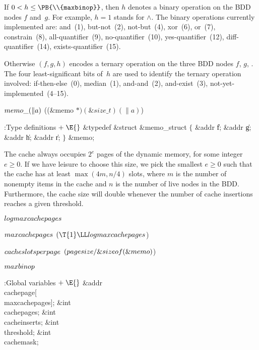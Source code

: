 \smallskip\textindent{$\bullet$} If $0<h\le\PB{\\{maxbinop}}$, then $h$
denotes a binary operation on the BDD nodes $f$ and~$g$.
For example, $h=1$ stands for $\land$. The binary operations currently
implemented are:
and~(1),
but-not~(2),
not-but~(4),
xor~(6),
or~(7),
constrain~(8),
all-quantifier~(9),
no-quantifier~(10),
yes-quantifier~(12),
diff-quantifier~(14),
exists-quantifier~(15).

\smallskip\textindent{$\bullet$} Otherwise $(f,g,h)$ encodes a ternary
operation on the three BDD nodes $f$, $g$, . The four
least-significant
bits of~$h$ are used to identify the ternary operation involved:
if-then-else~(0),
median~(1),
and-and~(2),
and-exist~(3),
not-yet-implemented~(4--15).

\Y\B\4\D$\\{memo\_}(\|a)$ \5
((\&{memo} ${}{*})(\&{size\_t})(\|a){}$)\par
\Y\B\4:Type definitions\X${}\mathrel+\E{}$\6
\&{typedef} \&{struct} \&{memo\_struct} ${}\{{}$\1\6
\&{addr} \|f;\6
\&{addr} \|g;\6
\&{addr} \|h;\6
\&{addr} \|r;\2\6
${}\}{}$ \&{memo};\par
\fi

The cache always occupies $2^e$ pages of the dynamic memory,
for some integer $e\ge0$. If we have leisure to choose this size, we pick
the smallest $e\ge0$ such that the cache has at least $\max(4m,n/4)$ slots,
where $m$ is the number of nonempty items in the cache and $n$ is
the number of live nodes in the BDD. Furthermore, the cache size
will double whenever the number of cache insertions reaches a
given threshold.

\Y\B\4\D$\\{logmaxcachepages}$ \5
\par
\B\4\D$\\{maxcachepages}$ \5
$(\T{1}\LL\\{logmaxcachepages}{}$)\par
\B\4\D$\\{cacheslotsperpage}$ \5
$(\\{pagesize}/\&{sizeof}(\&{memo}){}$)\par
\B\4\D$\\{maxbinop}$ \5
\par
\Y\B\4:Global variables\X${}\mathrel+\E{}$\6
\&{addr} \\{cachepage}[\\{maxcachepages}];\6
\&{int} \\{cachepages};\6
\&{int} \\{cacheinserts};\6
\&{int} \\{threshold};\6
\&{int} \\{cachemask};\par
\fi


